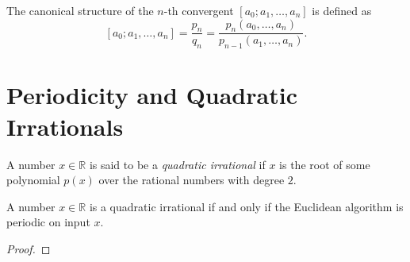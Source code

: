 \begin{definition}
  The canonical structure of the $n$-th convergent $[a_0; a_1, \dots, a_n]$ is defined as
  \[
    [a_0; a_1, \dots, a_n] = \frac{p_n}{q_n} = \frac{p_n(a_0, \dots, a_n)}{p_{n-1}(a_1, \dots, a_n)}.
  \]
\end{definition}

\section{Periodicity and Quadratic Irrationals}

\begin{definition}
  A number $x ∈ ℝ$ is said to be a \emph{quadratic irrational} if $x$ is the root of some
  polynomial $p(x)$ over the rational numbers with degree $2$.
\end{definition}

\begin{proposition}
  A number $x ∈ ℝ$ is a quadratic irrational
  if and only if the Euclidean algorithm is periodic on input $x$.
\end{proposition}

\begin{proof}

\end{proof}
